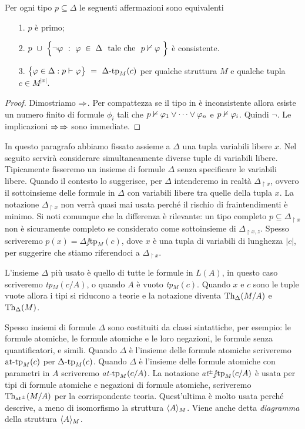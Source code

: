 \begin{lemma}\label{lemmatipiprimiconsistenti}
Per ogni tipo $p\subseteq\Delta$ le seguenti affermazioni sono equivalenti
\begin{itemize}
\item[1.] $p$ \`e primo;
\item[2.] $p\ \cup\ \Big\{\neg\phi\ :\  \phi\;\in\;\Delta\ \ \textrm{tale che}\ \ p\notproves\phi\ \Big\}$ \`e consistente.
\item[3.] $\big\{\phi\in\Delta : p\proves\phi\big\}\ = \ \Deltatp_M(c)$ per qualche struttura $M$ e qualche tupla $c\in M^{|x|}$.
\end{itemize}
\end{lemma}
\begin{proof}
Dimostriamo $\Rightarrow$. Per compattezza se il tipo in  \`e inconsistente allora esiste un numero finito di formule $\phi_i$ tali che $p\nvdash\varphi_1\vee\dots\vee\varphi_n$ e $p\nvdash\varphi_i$. Quindi $\neg$. Le implicazioni $\Rightarrow$$\Rightarrow$ sono immediate.
\end{proof}

In questo paragrafo abbiamo fissato assieme a $\Delta$ una tupla variabili libere $x$. Nel seguito servir\`a considerare simultaneamente diverse tuple di variabili libere. Tipicamente fisseremo un insieme di formule $\Delta$ senza specificare le variabili libere. Quando il contesto lo suggerisce, per $\Delta$ intenderemo in realt\`a \emph{$\Delta_{\restriction x}$}, ovvero il sottoinsieme delle formule in $\Delta$ con variabili libere tra quelle della tupla $x$. La notazione  $\Delta_{\restriction x}$ non verr\`a quasi mai usata perch\'e il rischio di fraintendimenti \`e minimo. Si noti comunque che la differenza \`e rilevante: un tipo completo $p\subseteq\Delta_{\restriction x}$ non \`e sicuramente completo se considerato come sottoinsieme di $\Delta_{\restriction x,z}$. Spesso scriveremo $p(x)=\Delta\jj$tp$_M(c)$, dove $x$ \`e una tupla di variabili di lunghezza $|c|$, per suggerire che stiamo riferendoci a $\Delta_{\restriction x}$. 

L'insieme $\Delta$ pi\`u usato \`e quello di tutte le formule in $L(A)$, in questo caso scriveremo \emph{tp$_M(c/A)$}, o quando $A$ \`e vuoto \emph{tp$_M(c)$}. Quando $x$ e $c$ sono le tuple vuote allora i tipi si riducono a teorie e la notazione diventa \emph{$\textrm{Th}_\Delta(M/A)$} e \emph{$\textrm{Th}_\Delta(M)$}.

Spesso insiemi di formule $\Delta$ sono costituiti da classi sintattiche, per esempio: le formule atomiche, le formule atomiche e le loro negazioni, le formule senza quantificatori, e simili.  Quando $\Delta$ \`e l'insieme delle formule atomiche scriveremo \emph{$\textrm{at\mbox{-}tp}_M(c)$\/} per $\Delta\mbox{-}\textrm{tp}_M(c)$. Quando $\Delta$ \`e l'insieme delle formule atomiche con parametri in $A$ scriveremo \emph{\textrm{at}-$\textrm{tp}_M(c/A)$}. La notazione \emph{\textrm{at}$^\pm\jj$$\textrm{tp}_M(c/A)$\/} \`e usata per tipi di formule atomiche e negazioni di formule atomiche, scriveremo \emph{$\textrm{Th}_{\textrm{\scriptsize at}^\pm}(M/A)$\/} per la corrispondente teoria. Quest'ultima \`e molto usata perch\'e descrive, a meno di isomorfismo la struttura $\langle A\rangle_M$. Viene anche detta \emph{diagramma\/} della struttura $\langle A\rangle_M$.



